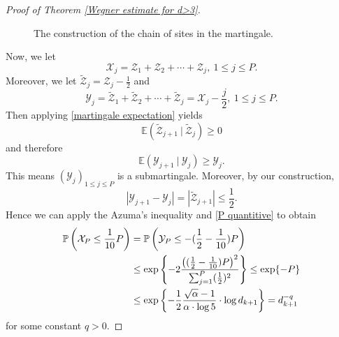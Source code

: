 \documentclass[11pt,reqno,UTF8,twoside]{amsart}
\newcommand{\E}{\mathbb{E}}
\renewcommand{\P}{\mathbb{P}}
\newcommand{\mcX}{\mathcal{X}}
\newcommand{\mcY}{\mathcal{Y}}
\newcommand{\mcZ}{\mathcal{Z}}
\theoremstyle{definition}
\numberwithin{equation}{section}
\begin{document}
\begin{proof}[Proof of Theorem \ref{Wegner estimate for d>3}]
\begin{figure}[htbp]
\begin{tikzpicture}[x=0.75pt,y=0.75pt,yscale=-0.9,xscale=0.9]
\end{tikzpicture}


\caption{The construction of the chain of sites in the martingale.}
\label{martingale Wegner fig}
  
\end{figure}




Now,  we let 
\begin{equation}\label{mcX}
  \mcX_j=\mcZ_1+\mcZ_2+\cdots + \mcZ_j,\ 1\leq j\leq P.
\end{equation}
Moreover, we let $\widetilde{\mcZ}_j=\mcZ_j-\frac{1}{2}$ and 
\begin{equation}\label{mcY}
  \mcY_j=\widetilde{\mcZ}_1+\widetilde{\mcZ}_2+\cdots+\widetilde{\mcZ}_j=\mcX_j-\frac{j}{2},  \ 1\leq j\leq P.
\end{equation}
Then applying \eqref{martingale expectation} yields 
\[\E(\widetilde{\mcZ}_{j+1} \ | \ \widetilde{\mcZ}_j)\geq 0\]
and therefore 
\[\E(\mcY_{j+1}  \ |\ \mcY_j)\geq \mcY_j.\]
This means $(\mcY_j)_{1\leq j\leq P}$ is a submartingale. Moreover, by our construction, 
\[|\mcY_{j+1}-\mcY_j|=|\widetilde{\mcZ}_{j+1}|\leq \frac{1}{2}.\]
Hence we can apply the Azuma's inequality and \eqref{P quantitive} to obtain 
\begin{align}\label{Azuma 1}
  \P\left(\mcX_P\leq \frac{1}{10}P\right) & = \P\left(\mcY_P\leq -(\frac{1}{2}-\frac{1}{10})P\right) \\
     \notag          &\leq \exp\left\{-2 \frac{\big((\frac{1}{2}-\frac{1}{10})P\big)^2}{\sum_{j=1}^P (\frac{1}{2})^2}\right\} \leq \exp\{-P\}\\
     \notag   &\leq \exp\left\{     -\frac{1}{2} \frac{\sqrt{\alpha}-1}{\alpha\cdot \log 5} \cdot \log d_{k+1}    \right\}=d_{k+1}^{-q}
\end{align}
for some constant $q>0$. 




\end{proof}
\end{document}
